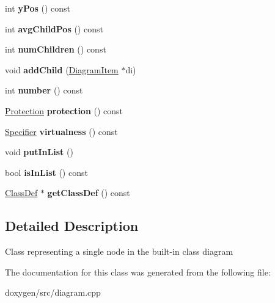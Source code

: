 \begin{DoxyCompactItemize}
\mbox{\label{class_diagram_item_ae193d7615423fc085db00b7de6619fc1}} 
int {\bfseries y\+Pos} () const
\item 
\mbox{\label{class_diagram_item_a4c30f183e25a88cc8e8281cfe2f4be34}} 
int {\bfseries avg\+Child\+Pos} () const
\item 
\mbox{\label{class_diagram_item_a24dbf05089f29d51ae4c0b797e593260}} 
int {\bfseries num\+Children} () const
\item 
\mbox{\label{class_diagram_item_a32ecbe11566dd5ede121ae0bbaf70945}} 
void {\bfseries add\+Child} (\mbox{\hyperlink{class_diagram_item}{Diagram\+Item}} $\ast$di)
\item 
\mbox{\label{class_diagram_item_a1244c82851a233d35ffbb9cae8923933}} 
int {\bfseries number} () const
\item 
\mbox{\label{class_diagram_item_aaca11d38f246c2a3f673d29720cc0426}} 
\mbox{\hyperlink{types_8h_a90e352184df58cd09455fe9996cd4ded}{Protection}} {\bfseries protection} () const
\item 
\mbox{\label{class_diagram_item_a11ec77d7b8a9920793793ead700627e1}} 
\mbox{\hyperlink{types_8h_ab16236bdd10ddf4d73a9847350f0017e}{Specifier}} {\bfseries virtualness} () const
\item 
\mbox{\label{class_diagram_item_ad27e4ec4bbcf59eb0c8bf33571fec70d}} 
void {\bfseries put\+In\+List} ()
\item 
\mbox{\label{class_diagram_item_ac41f2e7b5f1de27cec87bc9a366dc687}} 
bool {\bfseries is\+In\+List} () const
\item 
\mbox{\label{class_diagram_item_a267b5b1cf7b5bee5d2df5edd1f882a93}} 
\mbox{\hyperlink{class_class_def}{Class\+Def}} $\ast$ {\bfseries get\+Class\+Def} () const
\end{DoxyCompactItemize}


\subsection{Detailed Description}
Class representing a single node in the built-\/in class diagram 

The documentation for this class was generated from the following file\+:\begin{DoxyCompactItemize}
\item 
doxygen/src/diagram.\+cpp\end{DoxyCompactItemize}
